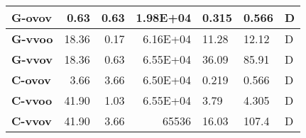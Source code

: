 \begin{table}[htb]
{\begin{tabular}{|l|r|r|r|l|l|l|}
\textbf{G-ovov} & 0.63 & 0.63 & 1.98E+04 & 0.315 & 0.566 & D \\ \hline
\textbf{G-vvoo} & 18.36 & 0.17 & 6.16E+04 & 11.28 & 12.12 & D \\ \hline
\textbf{G-vvov} & 18.36 & 0.63 & 6.55E+04 & 36.09 & 85.91 & D \\ \hline
\textbf{C-ovov} & 3.66 & 3.66 & 6.50E+04 & 0.219 & 0.566 & D \\ \hline
\textbf{C-vvoo} & 41.90 & 1.03 & 6.55E+04 & 3.79 & 4.305 & D \\ \hline
\textbf{C-vvov} & 41.90 & 3.66 & 65536 & 16.03 & 107.4 & D \\ \hline
\end{tabular}
}
\label{tab:prob_frostt}
\end{table}



